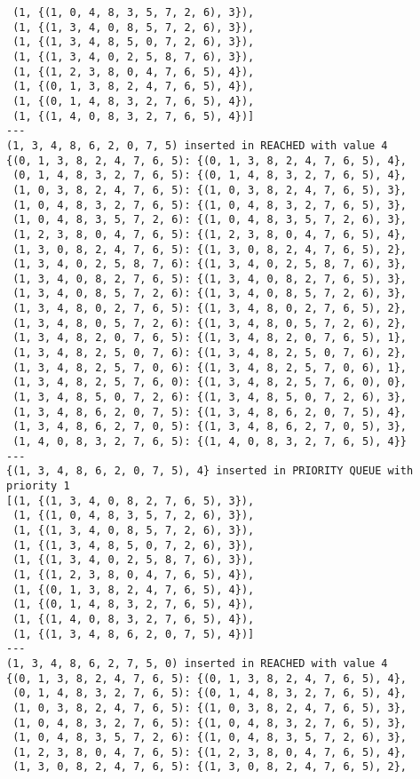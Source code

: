 \documentclass{article}
\begin{document}
\begin{verbatim}
 (1, {(1, 0, 4, 8, 3, 5, 7, 2, 6), 3}),
 (1, {(1, 3, 4, 0, 8, 5, 7, 2, 6), 3}),
 (1, {(1, 3, 4, 8, 5, 0, 7, 2, 6), 3}),
 (1, {(1, 3, 4, 0, 2, 5, 8, 7, 6), 3}),
 (1, {(1, 2, 3, 8, 0, 4, 7, 6, 5), 4}),
 (1, {(0, 1, 3, 8, 2, 4, 7, 6, 5), 4}),
 (1, {(0, 1, 4, 8, 3, 2, 7, 6, 5), 4}),
 (1, {(1, 4, 0, 8, 3, 2, 7, 6, 5), 4})]
---
(1, 3, 4, 8, 6, 2, 0, 7, 5) inserted in REACHED with value 4
{(0, 1, 3, 8, 2, 4, 7, 6, 5): {(0, 1, 3, 8, 2, 4, 7, 6, 5), 4},
 (0, 1, 4, 8, 3, 2, 7, 6, 5): {(0, 1, 4, 8, 3, 2, 7, 6, 5), 4},
 (1, 0, 3, 8, 2, 4, 7, 6, 5): {(1, 0, 3, 8, 2, 4, 7, 6, 5), 3},
 (1, 0, 4, 8, 3, 2, 7, 6, 5): {(1, 0, 4, 8, 3, 2, 7, 6, 5), 3},
 (1, 0, 4, 8, 3, 5, 7, 2, 6): {(1, 0, 4, 8, 3, 5, 7, 2, 6), 3},
 (1, 2, 3, 8, 0, 4, 7, 6, 5): {(1, 2, 3, 8, 0, 4, 7, 6, 5), 4},
 (1, 3, 0, 8, 2, 4, 7, 6, 5): {(1, 3, 0, 8, 2, 4, 7, 6, 5), 2},
 (1, 3, 4, 0, 2, 5, 8, 7, 6): {(1, 3, 4, 0, 2, 5, 8, 7, 6), 3},
 (1, 3, 4, 0, 8, 2, 7, 6, 5): {(1, 3, 4, 0, 8, 2, 7, 6, 5), 3},
 (1, 3, 4, 0, 8, 5, 7, 2, 6): {(1, 3, 4, 0, 8, 5, 7, 2, 6), 3},
 (1, 3, 4, 8, 0, 2, 7, 6, 5): {(1, 3, 4, 8, 0, 2, 7, 6, 5), 2},
 (1, 3, 4, 8, 0, 5, 7, 2, 6): {(1, 3, 4, 8, 0, 5, 7, 2, 6), 2},
 (1, 3, 4, 8, 2, 0, 7, 6, 5): {(1, 3, 4, 8, 2, 0, 7, 6, 5), 1},
 (1, 3, 4, 8, 2, 5, 0, 7, 6): {(1, 3, 4, 8, 2, 5, 0, 7, 6), 2},
 (1, 3, 4, 8, 2, 5, 7, 0, 6): {(1, 3, 4, 8, 2, 5, 7, 0, 6), 1},
 (1, 3, 4, 8, 2, 5, 7, 6, 0): {(1, 3, 4, 8, 2, 5, 7, 6, 0), 0},
 (1, 3, 4, 8, 5, 0, 7, 2, 6): {(1, 3, 4, 8, 5, 0, 7, 2, 6), 3},
 (1, 3, 4, 8, 6, 2, 0, 7, 5): {(1, 3, 4, 8, 6, 2, 0, 7, 5), 4},
 (1, 3, 4, 8, 6, 2, 7, 0, 5): {(1, 3, 4, 8, 6, 2, 7, 0, 5), 3},
 (1, 4, 0, 8, 3, 2, 7, 6, 5): {(1, 4, 0, 8, 3, 2, 7, 6, 5), 4}}
---
{(1, 3, 4, 8, 6, 2, 0, 7, 5), 4} inserted in PRIORITY QUEUE with priority 1
[(1, {(1, 3, 4, 0, 8, 2, 7, 6, 5), 3}),
 (1, {(1, 0, 4, 8, 3, 5, 7, 2, 6), 3}),
 (1, {(1, 3, 4, 0, 8, 5, 7, 2, 6), 3}),
 (1, {(1, 3, 4, 8, 5, 0, 7, 2, 6), 3}),
 (1, {(1, 3, 4, 0, 2, 5, 8, 7, 6), 3}),
 (1, {(1, 2, 3, 8, 0, 4, 7, 6, 5), 4}),
 (1, {(0, 1, 3, 8, 2, 4, 7, 6, 5), 4}),
 (1, {(0, 1, 4, 8, 3, 2, 7, 6, 5), 4}),
 (1, {(1, 4, 0, 8, 3, 2, 7, 6, 5), 4}),
 (1, {(1, 3, 4, 8, 6, 2, 0, 7, 5), 4})]
---
(1, 3, 4, 8, 6, 2, 7, 5, 0) inserted in REACHED with value 4
{(0, 1, 3, 8, 2, 4, 7, 6, 5): {(0, 1, 3, 8, 2, 4, 7, 6, 5), 4},
 (0, 1, 4, 8, 3, 2, 7, 6, 5): {(0, 1, 4, 8, 3, 2, 7, 6, 5), 4},
 (1, 0, 3, 8, 2, 4, 7, 6, 5): {(1, 0, 3, 8, 2, 4, 7, 6, 5), 3},
 (1, 0, 4, 8, 3, 2, 7, 6, 5): {(1, 0, 4, 8, 3, 2, 7, 6, 5), 3},
 (1, 0, 4, 8, 3, 5, 7, 2, 6): {(1, 0, 4, 8, 3, 5, 7, 2, 6), 3},
 (1, 2, 3, 8, 0, 4, 7, 6, 5): {(1, 2, 3, 8, 0, 4, 7, 6, 5), 4},
 (1, 3, 0, 8, 2, 4, 7, 6, 5): {(1, 3, 0, 8, 2, 4, 7, 6, 5), 2},

\end{verbatim}
\end{document}
